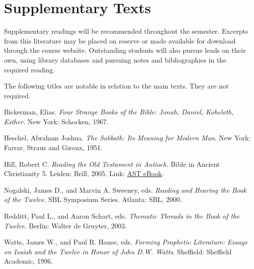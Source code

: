 \documentclass[titlepage]{article}
\begin{document}
\section{Supplementary Texts}
\label{supplementary}

Supplementary readings will be recommended throughout the semester.
Excerpts from this literature may be placed on reserve or made available
for download through the course website. Outstanding students will also
pursue leads on their own, using library databases and pursuing notes
and bibliographies in the required reading.

The following titles are notable in relation to the main texts. They are
not required.

\begingroup
\renewcommand{\section}[2]{}%
\begin{thebibliography}{3}%

	 Bickerman, Elias.
	\emph{Four Strange Books of the Bible: Jonah, Daniel, Koheleth, Esther}.
	New York: Schocken, 1967.

	 Heschel, Abraham Joshua.
	\emph{The Sabbath: Its Meaning for Modern Man}.
	New York: Farrar, Straus and Giroux, 1951.

	 Hill, Robert C.
	\emph{Reading the Old Testament in Antioch}. Bible in Ancient Christianity 5.
	Leiden: Brill, 2005. Link: \href{https://ast.primo.exlibrisgroup.com/view/action/uresolver.do?operation=resolveService&package_service_id=785748290007188&institutionId=7188&customerId=7185&VE=true}{AST eBook}.

	 Nogalski, James D., and Marvin A. Sweeney, eds.
	\emph{Reading and Hearing the Book of the Twelve}. SBL Symposium Series.
	Atlanta: SBL, 2000.

	 Redditt, Paul L., and Aaron Schart, eds.
	\emph{Thematic Threads in the Book of the Twelve}.
	Berlin: Walter de Gruyter, 2003.

	 Watts, James W., and Paul R. House, eds.
	\emph{Forming Prophetic Literature: Essays on Isaiah and the Twelve in Honor of John D.W. Watts}.
	Sheffield: Sheffield Academic, 1996.

\end{thebibliography}
\endgroup
\end{document}
